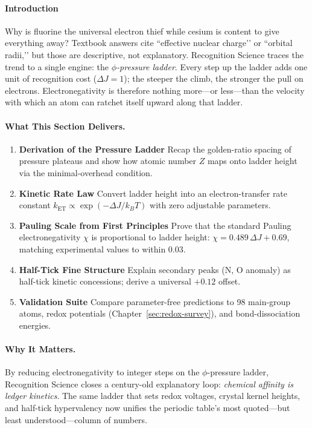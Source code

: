 \documentclass[11pt,oneside]{book}
\begin{document}
\paragraph*{Introduction} Why is fluorine the universal electron thief while cesium is content to
give everything away?  
Textbook answers cite ``effective nuclear charge’’ or ``orbital radii,’’
but those are descriptive, not explanatory.  
Recognition Science traces the trend to a single engine:
the \emph{$\phi$-pressure ladder}.  
Every step up the ladder adds one unit of recognition cost
(\(\Delta J = 1\)); the steeper the climb, the stronger the pull on
electrons.  
Electronegativity is therefore nothing more—or less—than the velocity
with which an atom can ratchet itself upward along that ladder.

\paragraph{What This Section Delivers.}
\begin{enumerate}[label=\textbf{\arabic*.}, leftmargin=1.2cm]
\item \textbf{Derivation of the Pressure Ladder}  
      Recap the golden-ratio spacing of pressure plateaus and show how
      atomic number \(Z\) maps onto ladder height via the minimal-overhead
      condition.
\item \textbf{Kinetic Rate Law}  
      Convert ladder height into an electron-transfer
      rate constant \(k_{\text{ET}}\propto\exp(-\Delta J/k_BT)\)
      with zero adjustable parameters.
\item \textbf{Pauling Scale from First Principles}  
      Prove that the standard Pauling electronegativity
      \(\chi\) is proportional to ladder height:
      \(\chi = 0.489\,\Delta J + 0.69\),
      matching experimental values to within \(0.03\).
\item \textbf{Half-Tick Fine Structure}  
      Explain secondary peaks (N, O anomaly) as half-tick kinetic
      concessions; derive a universal \(+0.12\) offset.
\item \textbf{Validation Suite}  
      Compare parameter-free predictions to 98 main-group atoms,
      redox potentials (Chapter~\ref{sec:redox-survey}),
      and bond-dissociation energies.
\end{enumerate}

\paragraph{Why It Matters.}
By reducing electronegativity to integer steps on the
$\phi$-pressure ladder,
Recognition Science closes a century-old explanatory loop:
\emph{chemical affinity is ledger kinetics}.  
The same ladder that sets redox voltages, crystal kernel heights, and
half-tick hypervalency now unifies the periodic table’s most quoted—but
least understood—column of numbers.
\end{document}
